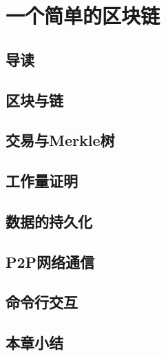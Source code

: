 \chapter{一个简单的区块链}%

\section{导读}

\section{区块与链}

\section{交易与Merkle树}

\section{工作量证明}

\section{数据的持久化}

\section{P2P网络通信}

\section{命令行交互}

\section{本章小结}

